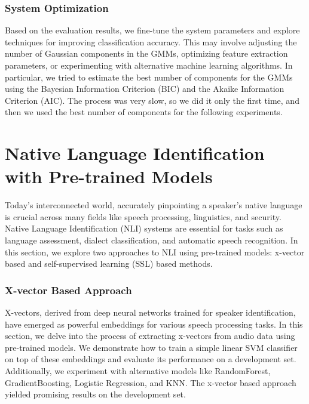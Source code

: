 \documentclass{Interspeech2024}
\begin{document}
\subsubsection{System Optimization}
Based on the evaluation results, we fine-tune the system parameters and explore techniques for improving classification accuracy. This may involve adjusting the number of Gaussian components in the GMMs, optimizing feature extraction parameters, or experimenting with alternative machine learning algorithms.
In particular, we tried to estimate the best number of components for the GMMs using the Bayesian Information Criterion (BIC) and the Akaike Information Criterion (AIC). The process was very slow, so we did it only the first time, and then we used the best number of components for the following experiments.


\section{Native Language Identification with Pre-trained Models}
Today's interconnected world, accurately pinpointing a speaker's native language is crucial across many fields like speech processing, linguistics, and security. Native Language Identification (NLI) systems are essential for tasks such as language assessment, dialect classification, and automatic speech recognition.
In this section, we explore two approaches to NLI using pre-trained models: x-vector based and self-supervised learning (SSL) based methods.

\subsubsection{X-vector Based Approach}

X-vectors, derived from deep neural networks trained for speaker identification, have emerged as powerful embeddings for various speech processing tasks. In this section, we delve into the process of extracting x-vectors from audio data using pre-trained models. We demonstrate how to train a simple linear SVM classifier on top of these embeddings and evaluate its performance on a development set. Additionally, we experiment with alternative models like RandomForest, GradientBoosting, Logistic Regression, and KNN. The x-vector based approach yielded promising results on the development set.
\end{document}
